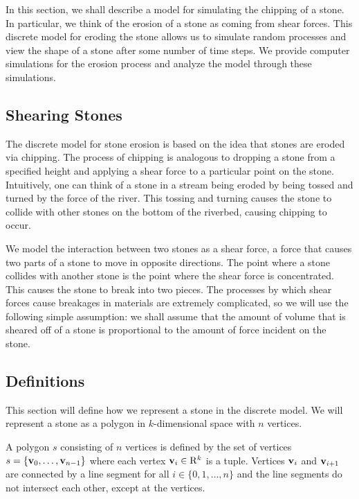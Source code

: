 In this section, we shall describe a model for simulating the chipping of a stone. In particular, we think of the erosion of a stone as coming from shear forces. This discrete model for eroding the stone allows us to simulate random processes and view the shape of a stone after some number of time steps. We provide computer simulations for the erosion process and analyze the model through these simulations.

\subsection{Shearing Stones}

The discrete model for stone erosion is based on the idea that stones are eroded via chipping. The process of chipping is analogous to dropping a stone from a specified height and applying a shear force to a particular point on the stone. Intuitively, one can think of a stone in a stream being eroded by being tossed and turned by the force of the river. This tossing and turning causes the stone to collide with other stones on the bottom of the riverbed, causing chipping to occur.

We model the interaction between two stones as a shear force, a force that causes two parts of a stone to move in opposite directions. The point where a stone collides with another stone is the point where the shear force is concentrated. This causes the stone to break into two pieces. The processes by which shear forces cause breakages in materials are extremely complicated, so we will use the following simple assumption: we shall assume that the amount of volume that is sheared off of a stone is proportional to the amount of force incident on the stone.

\subsection{Definitions}

This section will define how we represent a stone in the discrete model. We will represent a stone as a polygon in $k$-dimensional space with $n$ vertices.

\begin{definition}
  A polygon $s$ consisting of $n$ vertices is defined by the set of vertices $s = \{ \mathbf{v}_0, \ldots, \mathbf{v}_{n-1} \}$ where each vertex $\mathbf{v}_i \in \mathrm{R}^k$ is a tuple. Vertices $\mathbf{v}_i$ and $\mathbf{v}_{i+1}$ are connected by a line segment for all $i \in \{0, 1, \ldots, n \}$ and the line segments do not intersect each other, except at the vertices.
\end{definition}

